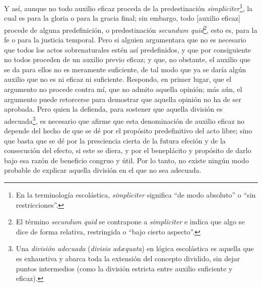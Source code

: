 \documentclass{article}
\begin{document}
Y así, aunque no todo auxilio eficaz proceda de la predestinación
\textit{simpliciter}\footnote{En la terminología escolástica, \textit{simpliciter}
significa \enquote{de modo absoluto} o \enquote{sin restricciones}.}, la cual es para la
gloria o para la gracia final; sin embargo, todo [auxilio eficaz] procede de alguna
predefinición, o predestinación \textit{secundum quid}\footnote{El término
\textit{secundum quid} se contrapone a \textit{simpliciter} e indica que algo se dice de
forma relativa, restringida o \enquote{bajo cierto aspecto}.}, esto es, para la fe o
para la justicia temporal. Pero si alguien argumentara que no es necesario que todos los
actos sobrenaturales estén así predefinidos, y que por consiguiente no todos proceden de
un auxilio previo eficaz; y que, no obstante, el auxilio que se da para ellos no es
meramente suficiente, de tal modo que ya se daría algún auxilio que no es ni eficaz ni
suficiente. Respondo, en primer lugar, que el argumento no procede contra mí, que no
admito aquella opinión; más aún, el argumento puede retorcerse para demostrar que
aquella opinión no ha de ser aprobada. Pero quien la defienda, para sostener que aquella
división es adecuada\footnote{Una \textit{división adecuada} (\textit{divisio adæquata})
en lógica escolástica es aquella que es exhaustiva y abarca toda la extensión del
concepto dividido, sin dejar puntos intermedios (como la división estricta entre auxilio
suficiente y eficaz).}, es necesario que afirme que esta denominación de auxilio eficaz
no depende del hecho de que se dé por el propósito predefinitivo del acto libre; sino
que basta que se dé por la presciencia cierta de la futura efeción y de la consecución
del efecto, si este se diera, y por el beneplácito y propósito de darlo bajo esa razón
de beneficio congruo y útil. Por lo tanto, no existe ningún modo probable de explicar
aquella división en el que no sea adecuada.
\end{document}
